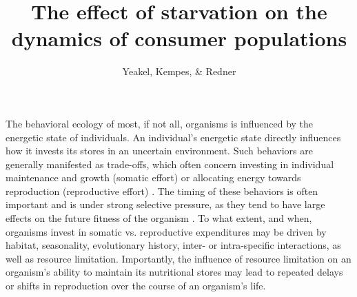 \documentclass[12pt,english]{article}
\begin{document}
\begin{spacing}{1.9}


\title{The effect of starvation on the dynamics of consumer populations}
\author{Yeakel, Kempes, \& Redner}
\maketitle

\linenumbers



The behavioral ecology of most, if not all, organisms is influenced by the energetic state of individuals.
An individual's energetic state directly influences how it invests its stores in an uncertain environment.
Such behaviors are generally manifested as trade-offs, which often concern investing in individual maintenance and growth (somatic effort) or allocating energy towards reproduction (reproductive effort) \citep{Martin:1987dl,Kirk:1997cc,Kempes:2012hy}. %
The timing of these behaviors is often important and is under strong selective pressure, as they tend to have large effects on the future fitness of the organism \citep{Mangel:1988uaa}.
To what extent, and when, organisms invest in somatic vs. reproductive expenditures may be driven by habitat, seasonality, evolutionary history, inter- or intra-specific interactions, as well as resource limitation.
Importantly, the influence of resource limitation on an organism's ability to maintain its nutritional stores may lead to repeated delays or shifts in reproduction over the course of an organism's life. %


\end{spacing}
\end{document}
